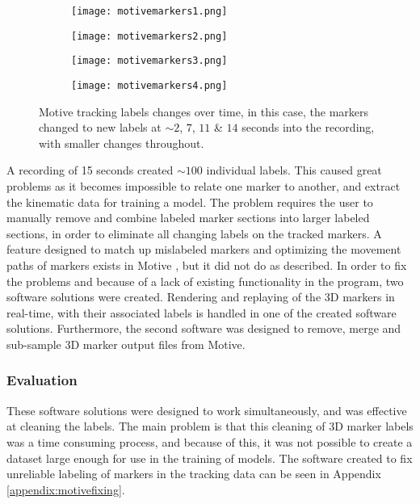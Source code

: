 \documentclass[../main.tex]{subfiles}
\begin{document}
\begin{figure}[H]
    \centering
    \begin{subfigure}[b]{0.49\textwidth}
        \centering
        \texttt{[image: motivemarkers1.png]}
    \end{subfigure}
    \hfill
    \centering
    \begin{subfigure}[b]{0.49\textwidth}
        \centering
        \texttt{[image: motivemarkers2.png]}
    \end{subfigure}
    \hfill
    \begin{subfigure}[b]{0.49\textwidth}
        \centering
        \texttt{[image: motivemarkers3.png]}
    \end{subfigure}
    \hfill
    \begin{subfigure}[b]{0.49\textwidth}
        \centering
        \texttt{[image: motivemarkers4.png]}
    \end{subfigure}
    \caption{Motive tracking labels changes over time, in this case, the markers changed to new labels at $\sim 2$, $7$, $11$ \& $14$ seconds into the recording, with smaller changes throughout.}
    \label{fig:motivelabels}
\end{figure}

A recording of 15 seconds created $\sim 100$ individual labels.
This caused great problems as it becomes impossible to relate one marker to another, and extract the kinematic data for training a model.
The problem requires the user to manually remove and combine labeled marker sections into larger labeled sections, in order to eliminate all changing labels on the tracked markers.
A feature designed to match up mislabeled markers and optimizing the movement paths of markers exists in Motive \cite{motive}, but it did not do as described.
In order to fix the problems and because of a lack of existing functionality in the program, two software solutions were created.
Rendering and replaying of the 3D markers in real-time, with their associated labels is handled in one of the created software solutions.
Furthermore, the second software was designed to remove, merge and sub-sample 3D marker output files from Motive.

\subsubsection{Evaluation}

These software solutions were designed to work simultaneously, and was effective at cleaning the labels.
The main problem is that this cleaning of 3D marker labels was a time consuming process, and because of this, it was not possible to create a dataset large enough for use in the training of models.
The software created to fix unreliable labeling of markers in the tracking data can be seen in Appendix \ref{appendix:motivefixing}.
\end{document}
